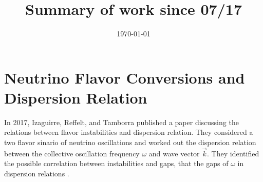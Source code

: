 \documentclass[12pt, letterpaper]{article}
\title{Summary of work since 07/17}
\author{}
\date{\today}
\begin{document}
\maketitle


\section{Neutrino Flavor Conversions and Dispersion Relation}

In 2017, Izaguirre, Reffelt, and Tamborra published a paper discussing the relations between flavor instabilities and dispersion relation. They considered a two flavor sinario of neutrino oscillations and worked out the dispersion relation between the collective oscillation frequency $\omega$ and wave vector $\vec k$. They identified the possible correlation between instabilities and gaps, that the gaps of $\omega$ in dispersion relations .
\end{document}
